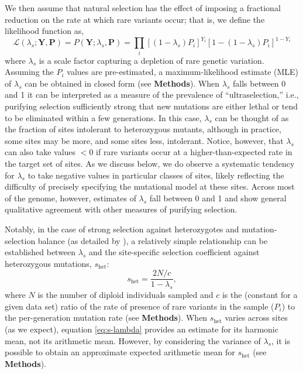 \documentclass[11pt]{article}
\newcommand{\mathbb}[1]{\boldsymbol{\mathbf{#1}}}
\begin{document}
We then assume that natural selection has the effect of imposing a fractional reduction on the rate at which rare variants occur; that is, we define the likelihood function as,
\begin{equation}
\mathcal{L}(\lambda_s; \mathbb{Y}, \mathbb{P}) =  P(\mathbb{Y}; \lambda_s, \mathbb{P}) = \prod_i \left[(1-\lambda_s) P_i\right]^{Y_i}\left[1- (1-\lambda_s) P_i\right]^{1-Y_i}
\end{equation}
\noindent where $\lambda_s$ is a scale factor capturing a depletion of rare genetic variation.  Assuming the $P_i$ values are pre-estimated, a maximum-likelihood estimate (MLE) of $\lambda_s$ can be obtained in closed form (see {\bf Methods}).
When $\lambda_s$ falls between 0 and 1 it can be interpreted as a measure of the prevalence of ``ultraselection,''
i.e., purifying selection sufficiently strong that new mutations are either lethal or tend  to be eliminated within a few generations.
In this case, $\lambda_s$ can be thought of as the fraction of sites intolerant to heterozygous mutants, although in practice, some sites may be more, and some sites less, intolerant.
Notice, however, that $\lambda_s$ can also take values $<0$ if
rare variants occur at a higher-than-expected rate in the target set of sites.
As we discuss below, we do observe a systematic tendency for $\lambda_s$ to take negative values in particular classes of sites, likely reflecting the difficulty of precisely specifying the mutational model at these sites.
Across most of the genome, however, estimates of $\lambda_s$ fall between 0 and 1 and show general qualitative agreement with other measures of purifying selection.

Notably, in the case of strong selection against heterozygotes and mutation-selection balance (as detailed by \cite{CASSETAL17,FULLETAL19}),
a relatively simple relationship can be established between $\lambda_s$ and the site-specific selection coefficient against heterozygous mutations, $s_{\text{het}}$:
\begin{equation}
  s_{\text{het}} = \frac{2N/c}{1-\lambda_s},
  \label{eq:s-lambda}
  \end{equation}
where $N$ is the number of diploid individuals sampled and $c$ is the (constant for a given data set) ratio of the rate of presence of rare variants in the sample ($P_i$) to the per-generation mutation rate (see {\bf Methods}).
When $s_{\text{het}}$ varies across sites (as we expect), equation \ref{eq:s-lambda} provides an estimate for its harmonic mean, not its arithmetic mean.  However,
by considering the variance of $\lambda_s$, it is possible to obtain an approximate expected arithmetic mean for $s_{\text{het}}$ (see {\bf Methods}).
\end{document}
